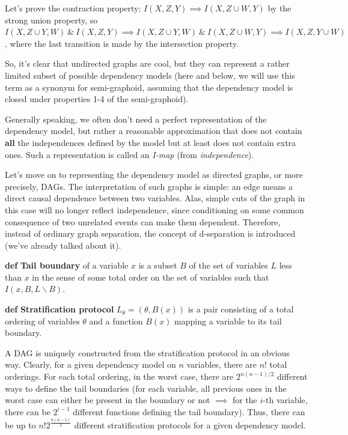 \documentclass[fleqn]{article}
\def\define#1{\textbf{def} \textbf{#1}}
\numberwithin{equation}{section}
\numberwithin{theorem}{section}
\numberwithin{figure}{section}
\numberwithin{lemma}{section}
\numberwithin{corollary}{section}
\begin{document}
Let's prove the contraction property: \( I(X, Z, Y) \implies I(X, Z \cup W, Y) \) by the strong union property, so \( I(X, Z \cup Y, W)\ \&\ I(X, Z, Y) \implies I(X, Z \cup Y, W)\ \&\ I(X, Z \cup W, Y) \implies I(X, Z, Y \cup W) \), where the last transition is made by the intersection property.

\vspace{0.2cm}

So, it's clear that undirected graphs are cool, but they can represent a rather limited subset of possible dependency models (here and below, we will use this term as a synonym for semi-graphoid, assuming that the dependency model is closed under properties 1-4 of the semi-graphoid).

Generally speaking, we often don't need a perfect representation of the dependency model, but rather a reasonable approximation that does not contain \textbf{all} the independences defined by the model but at least does not contain extra ones. Such a representation is called an \textit{I-map} (from \textit{independence}).

Let's move on to representing the dependency model as directed graphs, or more precisely, DAGs. The interpretation of such graphs is simple: an edge means a direct causal dependence between two variables. Alas, simple cuts of the graph in this case will no longer reflect independence, since conditioning on some common consequence of two unrelated events can make them dependent. Therefore, instead of ordinary graph separation, the concept of d-separation is introduced (we've already talked about it).

\define{Tail boundary} of a variable \( x \) is a subset \( B \) of the set of variables \( L \) less than \( x \) in the sense of some total order on the set of variables such that \( I(x, B, L \backslash B) \).

\define{Stratification protocol} \( L_\theta = (\theta, B(x)) \) is a pair consisting of a total ordering of variables \( \theta \) and a function \( B(x) \) mapping a variable to its tail boundary.

A DAG is uniquely constructed from the stratification protocol in an obvious way. Clearly, for a given dependency model on \( n \) variables, there are \( n! \) total orderings. For each total ordering, in the worst case, there are \( 2^{n(n-1)/2} \) different ways to define the tail boundaries (for each variable, all previous ones in the worst case can either be present in the boundary or not \(\implies\) for the \( i \)-th variable, there can be \( 2^{i-1} \) different functions defining the tail boundary). Thus, there can be up to \( n!2^{\frac{n(n-1)}{2}} \) different stratification protocols for a given dependency model.
\end{document}
